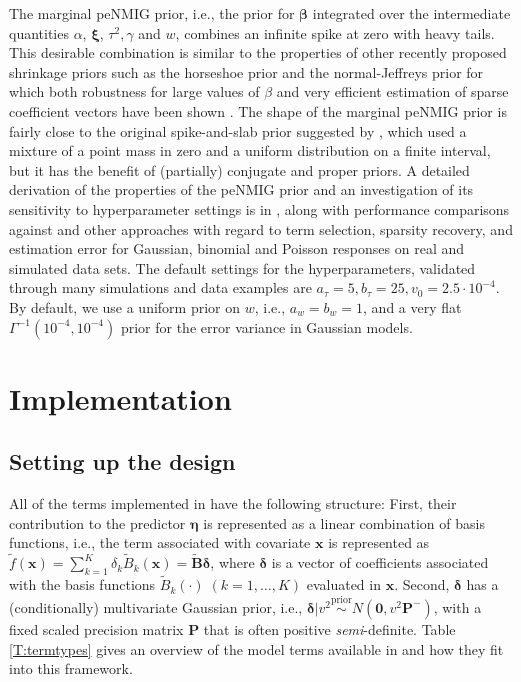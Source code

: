 \documentclass[article, shortnames, nojss, noheadings, notitle]{jss}
\newcommand{\priorsim}{\stackrel{\text{prior}}{\sim}}
\begin{document}
The marginal peNMIG prior, i.e., the prior for $\bm\beta$ integrated over
the intermediate quantities $\alpha$, $\bm \xi$, $\tau^2, \gamma$ and $w$,
combines an infinite spike at zero with heavy
tails. This desirable combination is similar to the properties of
other recently proposed shrinkage
priors such as the horseshoe prior \citep{Carvalho:2010} and the
normal-Jeffreys prior \citep{Bae:Mallick:2004} for which both
robustness for large values of $\beta$ and very efficient estimation
of sparse coefficient vectors have been shown
\citep{Polson:Scott:2010}.
The shape of the marginal peNMIG prior is fairly close to the
original spike-and-slab prior suggested by
\citet{Mitchell:Beauchamp:1988}, which used a mixture of a point
mass in zero and a uniform distribution on a finite interval, but
it has the benefit of (partially) conjugate and proper
priors. A detailed derivation of the properties of the peNMIG prior
and an investigation of its sensitivity to hyperparameter settings
is in \citet{Scheipl:2010}, along with
performance comparisons against 
and other approaches with regard to
term selection, sparsity recovery, and
estimation error for Gaussian, binomial and Poisson responses on
real and simulated data sets.
The default settings for the hyperparameters, validated through many simulations and
data examples are $a_\tau=5, b_\tau=25, v_0=2.5\cdot10^{-4}$. By default,
we use a uniform prior on $w$, i.e., $a_w=b_w=1$, and a very flat $\Gamma^{-1}(10^{-4},10^{-4})$ prior
for the error variance in Gaussian models.



\section{Implementation}\label{implementation}

\subsection{Setting up the design}\label{design}
All of the terms implemented in  have the following structure:
First, their contribution to the predictor $\bm \eta$ is represented as a linear combination of basis functions,
i.e., the
term associated with covariate $\bm x$ is represented as
$\tilde f(\bm x) = \sum_{k=1}^K \delta_{k}\tilde B_k(\bm x)= \bm{\tilde{B}} \bm \delta$,
where $\bm\delta$ is a vector of coefficients associated with
the basis functions $\tilde B_k(\cdot)\;( k=1,\ldots,K)$ evaluated in $\bm x$.
Second, $\bm\delta$ has a (conditionally) multivariate Gaussian prior, i.e., $\bm\delta|v^2 \priorsim N(\bm 0, v^2\bm P^-)$,
with a fixed scaled precision matrix $\bm P$ that is often positive \emph{semi}-definite.
Table \ref{T:termtypes} gives an overview of the model terms available in  and how they fit into this
framework.
\end{document}
